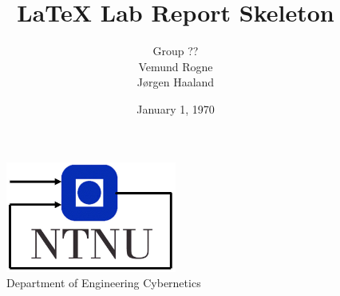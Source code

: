 \documentclass{article} %
\begin{document}
\title{LaTeX Lab Report Skeleton}
\author{Group ??\\Vemund Rogne\\Jørgen Haaland}
\date{January 1, 1970}
\begin{titlepage}
    \maketitle
    \begin{figure}
    \centering
    \includegraphics[width=0.5\textwidth]{figures/itk_ntnu}\\
    Department of Engineering Cybernetics
    \end{figure}
    \thispagestyle{empty}
\end{titlepage}

\newpage
\tableofcontents
\thispagestyle{empty} %


\newpage
\setcounter{page}{1}




\begin{figure}
    \begin{center}
        
    \end{center}
\end{figure}

\newpage
{}


\label{sec:bibliography}
\end{document}
